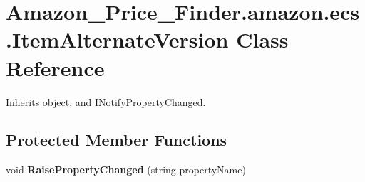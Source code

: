 \hypertarget{class_amazon___price___finder_1_1amazon_1_1ecs_1_1_item_alternate_version}{\section{Amazon\-\_\-\-Price\-\_\-\-Finder.\-amazon.\-ecs.\-Item\-Alternate\-Version Class Reference}
\label{class_amazon___price___finder_1_1amazon_1_1ecs_1_1_item_alternate_version}
}


 




Inherits object, and I\-Notify\-Property\-Changed.

\subsection*{Protected Member Functions}
\begin{DoxyCompactItemize}
\item 
\hypertarget{class_amazon___price___finder_1_1amazon_1_1ecs_1_1_item_alternate_version_a33d1e6790b029d044103dd2cdbade04e}{void {\bfseries Raise\-Property\-Changed} (string property\-Name)}\label{class_amazon___price___finder_1_1amazon_1_1ecs_1_1_item_alternate_version_a33d1e6790b029d044103dd2cdbade04e}

\end{DoxyCompactItemize}
